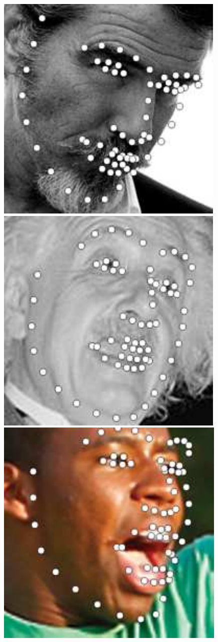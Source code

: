 \documentclass[journal]{IEEEtran}
\begin{document}
\begin{figure}[!htb]
\includegraphics[scale=0.22]{68_MCNet_image_044}
\includegraphics[scale=0.22]{68_MCNet_image_040}
\includegraphics[scale=0.22]{68_MCNet_image_014_01}

\end{figure}
\end{document}
